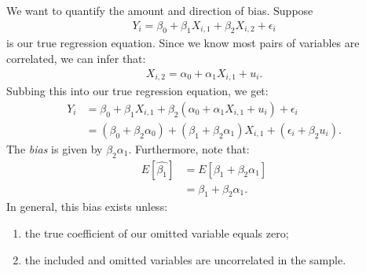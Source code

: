 \documentclass[11pt,twoside,openany]{memoir}
\begin{document}
        \begin{example}
            We want to quantify the amount and direction of bias. Suppose
                \begin{equation*}
                \begin{split}
                    Y_i = \beta_0 + \beta_1 X_{i,1} + \beta_2 X_{i,2} + \epsilon_i
                \end{split}
                \end{equation*}
            is our true regression equation. Since we know most pairs of variables are correlated, we can infer that:
                \begin{equation*}
                \begin{split}
                    X_{i,2} = \alpha_0 + \alpha_1 X_{i,1} + u_i.
                \end{split}
                \end{equation*}
            Subbing this into our true regression equation, we get:
                \begin{equation*}
                \begin{split}
                    Y_i 
                    & = \beta_0 + \beta_1 X_{i,1} + \beta_2 (\alpha_0 + \alpha_1 X_{i,1} + u_i) + \epsilon_i \\
                    & = (\beta_0 + \beta_2 \alpha_0) + (\beta_1 + \beta_2 \alpha_1) X_{i,1} + (\epsilon_i + \beta_2 u_i).
                \end{split}
                \end{equation*}
            The \textit{bias} is given by $\beta_2 \alpha_1$. Furthermore, note that:
                \begin{equation*}
                \begin{split}
                    E[\widehat{\beta_1}]
                    & = E[\beta_1 + \beta_2 \alpha_1] \\
                    & = \beta_1 + \beta_2 \alpha_1.
                \end{split}
                \end{equation*}
            In general, this bias exists unless:
                \begin{enumerate}[label = \arabic*. ,itemsep=1pt,topsep=3pt]
                    \item the true coefficient of our omitted variable equals zero;
                    \item the included and omitted variables are uncorrelated in the sample.
                \end{enumerate}
        \end{example}
\end{document}
